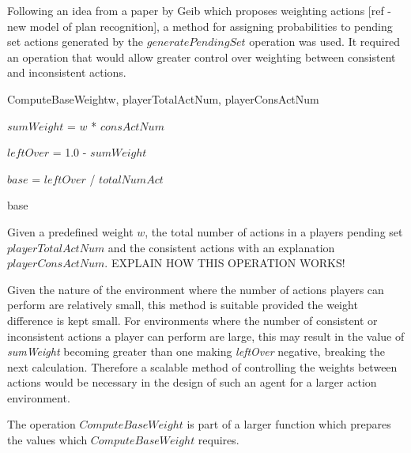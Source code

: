 \documentclass[parskip]{cs4rep}
\begin{document}
Following an idea from a paper by Geib which proposes weighting actions [ref - new model of plan recognition], a method for assigning probabilities to pending set actions generated by the $generatePendingSet$ operation was used. It required an operation that would allow greater control over weighting between consistent and inconsistent actions.

\begin{pseudocode}[ruled]{ComputeBaseWeight}{w, playerTotalActNum, playerConsActNum}
\begin{algorithm}[H]

$sumWeight$ = $w$ * $consActNum$

$leftOver$ = 1.0 - $sumWeight$

$base$ = $leftOver$ / $totalNumAct$

\Return base
\end{algorithm}
\end{pseudocode}

Given a predefined weight $w$, the total number of actions in a players pending set $playerTotalActNum$ and the consistent actions with an explanation $playerConsActNum$. EXPLAIN HOW THIS OPERATION WORKS!

Given the nature of the environment where the number of actions players can perform are relatively small, this method is suitable provided the weight difference is kept small. For environments where the number of consistent or inconsistent actions a player can perform are large, this may result in the value of \textit{sumWeight} becoming greater than one making \textit{leftOver} negative, breaking the next calculation. Therefore a scalable method of controlling the weights between actions would be necessary in the design of such an agent for a larger action environment.

The operation $ComputeBaseWeight$ is part of a larger function which prepares the values which $ComputeBaseWeight$ requires.
\end{document}
